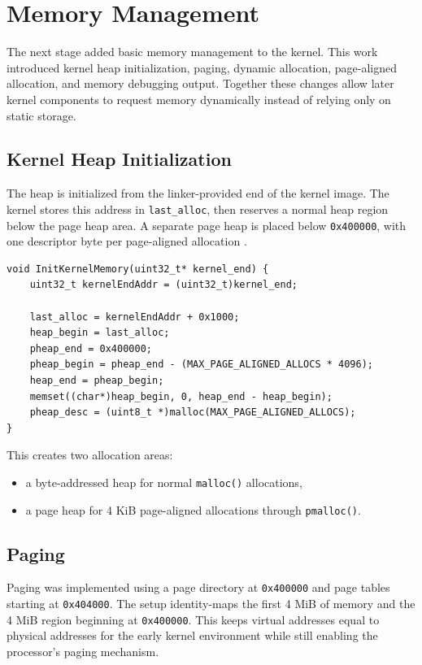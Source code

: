 \section{Memory Management}

The next stage added basic memory management to the kernel. This work introduced kernel heap initialization, paging, dynamic allocation, page-aligned allocation, and memory debugging output. Together these changes allow later kernel components to request memory dynamically instead of relying only on static storage\cite{assignmentFiles,osdevMemoryAllocation}.

\subsection{Kernel Heap Initialization}
The heap is initialized from the linker-provided end of the kernel image. The kernel stores this address in \texttt{last\_alloc}, then reserves a normal heap region below the page heap area. A separate page heap is placed below \texttt{0x400000}, with one descriptor byte per page-aligned allocation \cite{assignmentFiles}.

\begin{listing}[H]
\begin{verbatim}
void InitKernelMemory(uint32_t* kernel_end) {
    uint32_t kernelEndAddr = (uint32_t)kernel_end;

    last_alloc = kernelEndAddr + 0x1000;
    heap_begin = last_alloc;
    pheap_end = 0x400000;
    pheap_begin = pheap_end - (MAX_PAGE_ALIGNED_ALLOCS * 4096);
    heap_end = pheap_begin;
    memset((char*)heap_begin, 0, heap_end - heap_begin);
    pheap_desc = (uint8_t *)malloc(MAX_PAGE_ALIGNED_ALLOCS);
}
\end{verbatim}
\caption{Kernel heap initialization using the linker-provided kernel end symbol.}
\end{listing}

This creates two allocation areas:
\begin{itemize}
  \item a byte-addressed heap for normal \texttt{malloc()} allocations,
  \item a page heap for 4 KiB page-aligned allocations through \texttt{pmalloc()}.
\end{itemize}
\clearpage

\subsection{Paging}
Paging was implemented using a page directory at \texttt{0x400000} and page tables starting at \texttt{0x404000}. The setup identity-maps the first 4 MiB of memory and the 4 MiB region beginning at \texttt{0x400000}. This keeps virtual addresses equal to physical addresses for the early kernel environment while still enabling the processor's paging mechanism\cite{assignmentFiles,osdevSettingUpPaging}.

